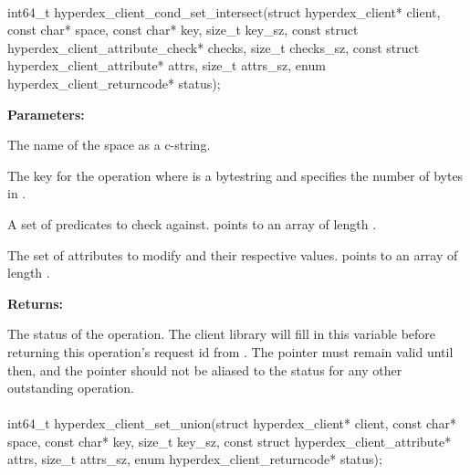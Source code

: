 \paragraph{}
\begin{ccode}
int64_t hyperdex_client_cond_set_intersect(struct hyperdex_client* client,
                const char* space,
                const char* key, size_t key_sz,
                const struct hyperdex_client_attribute_check* checks, size_t checks_sz,
                const struct hyperdex_client_attribute* attrs, size_t attrs_sz,
                enum hyperdex_client_returncode* status);
\end{ccode}
\funcdesc 

\noindent\textbf{Parameters:}
\begin{description}[labelindent=\widthof{{\code{checks}, \code{checks\_sz}}},leftmargin=*,noitemsep,nolistsep,align=right]
\item[\code{space}] The name of the space as a c-string.
\item[\code{key}, \code{key\_sz}] The key for the operation where  is a bytestring and  specifies the number of bytes in .
\item[\code{checks}, \code{checks\_sz}] A set of predicates to check against.   points to an array of length .
\item[\code{attrs}, \code{attrs\_sz}] The set of attributes to modify and their respective values.   points to an array of length .
\end{description}

\noindent\textbf{Returns:}
\begin{description}[labelindent=\widthof{{\code{status}}},leftmargin=*,noitemsep,nolistsep,align=right]
\item[\code{status}] The status of the operation.  The client library will fill in this variable before returning this operation's request id from .  The pointer must remain valid until then, and the pointer should not be aliased to the status for any other outstanding operation.
\end{description}

\paragraph{}
\begin{ccode}
int64_t hyperdex_client_set_union(struct hyperdex_client* client,
                const char* space,
                const char* key, size_t key_sz,
                const struct hyperdex_client_attribute* attrs, size_t attrs_sz,
                enum hyperdex_client_returncode* status);
\end{ccode}
\funcdesc 

